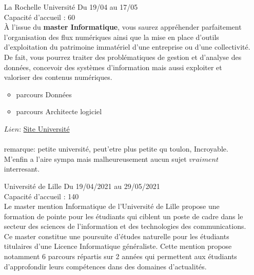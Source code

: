 \documentclass[a4paper,11pt]{article}
\newcommand{\e}{\'{e}}
\begin{document}
\begin{enumerate}
            \begin{itemize}
                \item Ingénierie du Logiciel de la SociétE Numérique (ILSEN)
                \item Systèmes Informatiques Communicants : réseaux, services et sécurité
                \item Intelligence Artificielle (IA)
            \end{itemize}
                $Lien$: \href{https://ceri.univ-avignon.fr/formations/master-informatique/}{Site Université}\\
                remarque: Rien de tres remarquable mais il semblerait qu'elle possede un taux de pression faible, a v\e rifier
\\
        \item [\color{LightOrangeHaf} La Rochelle Université] Du 19/04 au 17/05 
                \\Capacité d'accueil : 60
                \\À l’issue du \textbf{master Informatique}, vous saurez appréhender parfaitement l’organisation des flux numériques ainsi que la mise en place d’outils d’exploitation du patrimoine immatériel d’une entreprise ou d’une collectivité. De fait, vous pourrez traiter des problématiques de gestion et d’analyse des données, concevoir des systèmes d’information mais aussi exploiter et valoriser des contenus numériques.
                \begin{itemize}
                    \item parcours Données
                    \item parcours Architecte logiciel
                \end{itemize}
                $Lien$: \href{https://sciences.univ-larochelle.fr/master-informatique}{Site Université}\\
                \\remarque: petite université, peut'etre plus petite qu toulon, Incroyable.  M'enfin a l'aire sympa mais malheureusement aucun sujet $vraiment$ interresant.
\\
        \item [\color{LightOrangeHaf}Université de Lille] Du 19/04/2021 au 29/05/2021
                \\Capacité d'accueil : 140
                \\Le master mention Informatique de l’Université de Lille propose une formation de pointe pour les étudiants qui ciblent un poste de cadre dans le secteur des sciences de l’information et des technologies des communications. Ce master constitue une poursuite d’études naturelle pour les étudiants titulaires d’une Licence Informatique généraliste. Cette mention propose notamment 6 parcours répartis sur 2 années qui permettent aux étudiants d’approfondir leurs compétences dans des domaines d’actualités. 

\end{enumerate}
\end{document}
